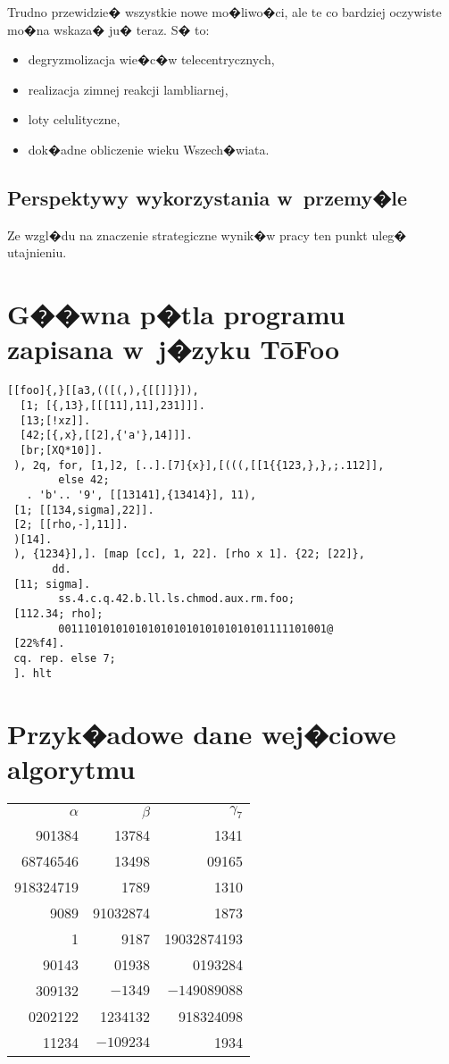 \documentclass[licencjacka]{pracamgr}
\begin{document}
Trudno przewidzie� wszystkie nowe mo�liwo�ci, ale te co bardziej
oczywiste mo�na wskaza� ju� teraz.  S� to:
\begin{itemize}
\item degryzmolizacja wie�c�w telecentrycznych,
\item realizacja zimnej reakcji lambliarnej,
\item loty celulityczne,
\item dok�adne obliczenie wieku Wszech�wiata.
\end{itemize}

\section{Perspektywy wykorzystania w~przemy�le}

Ze wzgl�du na znaczenie strategiczne wynik�w pracy ten punkt uleg�
utajnieniu.

\appendix

\chapter{G��wna p�tla programu zapisana w~j�zyku T\=oFoo}

\begin{verbatim}
[[foo]{,}[[a3,(([(,),{[[]]}]),
  [1; [{,13},[[[11],11],231]]].
  [13;[!xz]].
  [42;[{,x},[[2],{'a'},14]]].
  [br;[XQ*10]].
 ), 2q, for, [1,]2, [..].[7]{x}],[(((,[[1{{123,},},;.112]],
        else 42;
   . 'b'.. '9', [[13141],{13414}], 11),
 [1; [[134,sigma],22]].
 [2; [[rho,-],11]].
 )[14].
 ), {1234}],]. [map [cc], 1, 22]. [rho x 1]. {22; [22]},
       dd.
 [11; sigma].
        ss.4.c.q.42.b.ll.ls.chmod.aux.rm.foo;
 [112.34; rho];
        001110101010101010101010101010101111101001@
 [22%f4].
 cq. rep. else 7;
 ]. hlt
\end{verbatim}

\chapter{Przyk�adowe dane wej�ciowe algorytmu}

\begin{center}
  \begin{tabular}{rrr}
    $\alpha$ & $\beta$ & $\gamma_7$ \\
    901384 & 13784 & 1341\\
    68746546 & 13498& 09165\\
    918324719& 1789 & 1310 \\
    9089 & 91032874& 1873 \\
    1 & 9187 & 19032874193 \\
    90143 & 01938 & 0193284 \\
    309132 & $-1349$ & $-149089088$ \\
    0202122 & 1234132 & 918324098 \\
    11234 & $-109234$ & 1934 \\
  \end{tabular}
\end{center}
\end{document}
